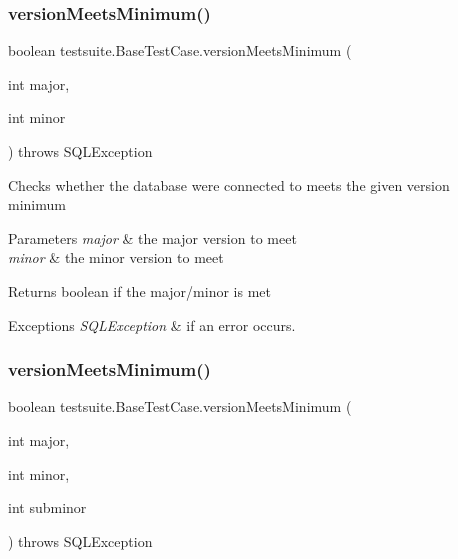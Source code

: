 \subsubsection{\texorpdfstring{version\+Meets\+Minimum()}{versionMeetsMinimum()}\hspace{0.1cm}{\footnotesize\ttfamily [1/2]}}
{\footnotesize\ttfamily boolean testsuite.\+Base\+Test\+Case.\+version\+Meets\+Minimum (\begin{DoxyParamCaption}\item[{int}]{major,  }\item[{int}]{minor }\end{DoxyParamCaption}) throws S\+Q\+L\+Exception\hspace{0.3cm}{\ttfamily [protected]}}

Checks whether the database we\textquotesingle{}re connected to meets the given version minimum


\begin{DoxyParams}{Parameters}
{\em major} & the major version to meet \\
\hline
{\em minor} & the minor version to meet\\
\hline
\end{DoxyParams}
\begin{DoxyReturn}{Returns}
boolean if the major/minor is met
\end{DoxyReturn}

\begin{DoxyExceptions}{Exceptions}
{\em S\+Q\+L\+Exception} & if an error occurs. \\
\hline
\end{DoxyExceptions}
\mbox{\label{classtestsuite_1_1_base_test_case_a13e93e8347469a0c2e8dbf3be8795bb5}} 
\subsubsection{\texorpdfstring{version\+Meets\+Minimum()}{versionMeetsMinimum()}\hspace{0.1cm}{\footnotesize\ttfamily [2/2]}}
{\footnotesize\ttfamily boolean testsuite.\+Base\+Test\+Case.\+version\+Meets\+Minimum (\begin{DoxyParamCaption}\item[{int}]{major,  }\item[{int}]{minor,  }\item[{int}]{subminor }\end{DoxyParamCaption}) throws S\+Q\+L\+Exception\hspace{0.3cm}{\ttfamily [protected]}}


